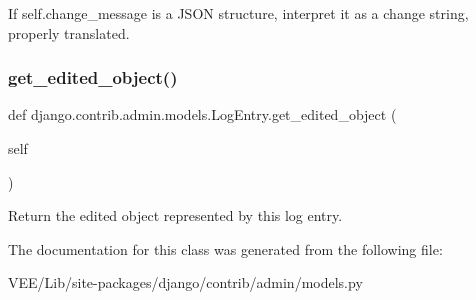 \begin{DoxyVerb}If self.change_message is a JSON structure, interpret it as a change
string, properly translated.
\end{DoxyVerb}
 \mbox{\label{classdjango_1_1contrib_1_1admin_1_1models_1_1_log_entry_a6eb5721255d01d593dd84c18e0729dba}} 
\subsubsection{\texorpdfstring{get\+\_\+edited\+\_\+object()}{get\_edited\_object()}}
{\footnotesize\ttfamily def django.\+contrib.\+admin.\+models.\+Log\+Entry.\+get\+\_\+edited\+\_\+object (\begin{DoxyParamCaption}\item[{}]{self }\end{DoxyParamCaption})}

\begin{DoxyVerb}Return the edited object represented by this log entry.\end{DoxyVerb}
 

The documentation for this class was generated from the following file\+:\begin{DoxyCompactItemize}
\item 
V\+E\+E/\+Lib/site-\/packages/django/contrib/admin/models.\+py\end{DoxyCompactItemize}
